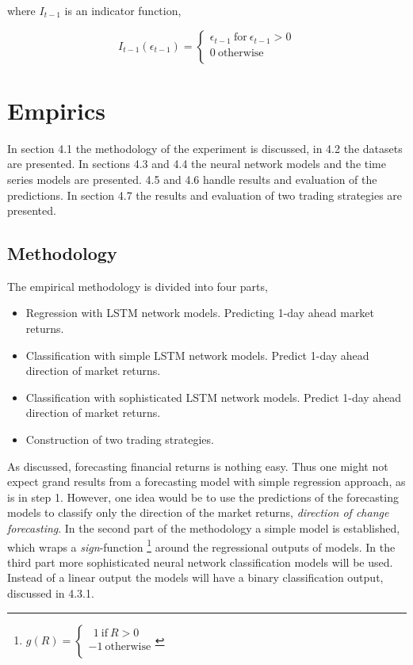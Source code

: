 \documentclass[12pt, letterpaper]{amsart}%
\begin{document}
where $I_{t-1}$ is an indicator function,

\begin{equation}
I_{t-1}(\epsilon_{t-1}) = 
     \begin{cases}
       \epsilon_{t-1} \ \text{for} \ \epsilon_{t-1} > 0 \\
       0 \ \text{otherwise} \\ 
     \end{cases}
\end{equation}


\section{Empirics}
In section 4.1 the methodology of the experiment is discussed, in 4.2 the datasets are presented. In sections 4.3 and 4.4 the neural network models and the time series models are presented. 4.5 and 4.6 handle results and evaluation of the predictions. In section 4.7 the results and evaluation of two trading strategies are presented.

\subsection{Methodology}
The empirical methodology is divided into four parts,
\\

\begin{itemize}  
\item Regression with LSTM network models. Predicting 1-day ahead market returns.
\item Classification with simple LSTM network models. Predict 1-day ahead direction of market returns.
\item Classification with sophisticated LSTM network models. Predict 1-day ahead direction of market returns.
\item Construction of two trading strategies.
\end{itemize}
\vspace{0.5cm}

As discussed, forecasting financial returns is nothing easy. Thus one might not expect grand results from a forecasting model with simple regression approach, as is in step 1. However, one idea would be to use the predictions of the forecasting models to classify only the direction of the market returns, \textit{direction of change forecasting}. In the second part of the methodology a simple model is established, which wraps a \textit{sign}-function \footnote{$g(R) = 
     \begin{cases}
       \ \ 1 \ \text{if} \ R > 0 \\
       -1 \ \text{otherwise} \\ 
     \end{cases}$} around the regressional outputs of models. In the third part more sophisticated neural network classification models will be used. Instead of a linear output the models will have a binary classification output, discussed in 4.3.1.
\\
\end{document}
